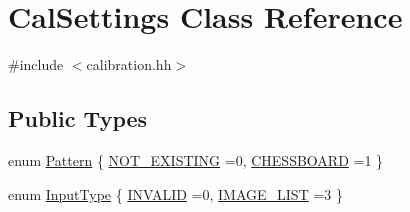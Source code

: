 \hypertarget{class_cal_settings}{}\section{Cal\+Settings Class Reference}
\label{class_cal_settings}


{\ttfamily \#include $<$calibration.\+hh$>$}

\subsection*{Public Types}
\begin{DoxyCompactItemize}
\item 
enum \mbox{\hyperlink{class_cal_settings_a0a24f2a2a233efe9213f28e527314500}{Pattern}} \{ \mbox{\hyperlink{class_cal_settings_a0a24f2a2a233efe9213f28e527314500ae4a4d43b266ad7071b87781d63db6325}{N\+O\+T\+\_\+\+E\+X\+I\+S\+T\+I\+NG}} =0, 
\mbox{\hyperlink{class_cal_settings_a0a24f2a2a233efe9213f28e527314500abbce277bb8f1f2450efbf10d14258264}{C\+H\+E\+S\+S\+B\+O\+A\+RD}} =1
 \}
\item 
enum \mbox{\hyperlink{class_cal_settings_aeec3099e1fed6e349e9e006004bc3d58}{Input\+Type}} \{ \mbox{\hyperlink{class_cal_settings_aeec3099e1fed6e349e9e006004bc3d58ac7f02a9057bd231c457feb514f4ecff6}{I\+N\+V\+A\+L\+ID}} =0, 
\mbox{\hyperlink{class_cal_settings_aeec3099e1fed6e349e9e006004bc3d58a42620be27f3baf3945f97c4a0451b56a}{I\+M\+A\+G\+E\+\_\+\+L\+I\+ST}} =3
 \}
\end{DoxyCompactItemize}
